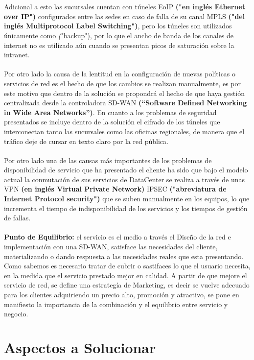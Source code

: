 \\
\\
Adicional a esto las sucursales cuentan con túneles EoIP \textbf{("en inglés Ethernet over IP")} configurados entre las sedes en caso de falla de su canal MPLS \textbf{("del inglés Multiprotocol Label Switching")}, pero los túneles son utilizados únicamente como \textit("backup"), por lo que el ancho de banda de los canales de internet no es utilizado aún cuando se presentan picos de saturación sobre la intranet.
\\
\\ 
Por otro lado la causa de la lentitud en la configuración de nuevas políticas o servicios de red es el hecho de que los cambios se realizan manualmente, es por este motivo que dentro de la solución se propondrá el hecho de que haya gestión centralizada desde la controladora SD-WAN \textbf{(“Software Defined Networking in Wide Area Networks”)}. En cuanto a los problemas de seguridad presentados se incluye dentro de la solución el cifrado de los túneles que interconectan tanto las sucursales como las oficinas regionales, de manera que el tráfico deje de cursar en texto claro por la red pública.
\\
\\
Por otro lado una de las causas más importantes de los problemas de disponibilidad de servicio que ha presentado el cliente ha sido que bajo el modelo actual la conmutación de sus servicios de DataCenter se realiza a través de unas VPN \textbf{(en inglés Virtual Private Network)} IPSEC \textbf{("abreviatura de Internet Protocol security")} que se suben manualmente en los equipos, lo que incrementa el tiempo de indisponibilidad de los servicios y los tiempos de gestión de fallas.
\\
\\
\textbf{Punto de Equilibrio:} el servicio es el medio a través el Diseño de la red e implementación con una SD-WAN, satisface las necesidades del cliente, materializando o dando respuesta a las necesidades reales que esta presentando. Como sabemos es necesario tratar de cubrir o sastifaces lo que el usuario necesita, en la medida que el servicio prestado mejor en calidad. A partir de que mejore el servicio de red, se define una estrategía de Marketing, es decir se vuelve adecuado para los clientes adquiriendo un precio alto, promoción y atractivo, se pone en manifiesto la importancia de la combinación y el equilibrio entre servicio y negocio.

\section{Aspectos a Solucionar} %
\label{sec:Aspectos a Solucionar}

